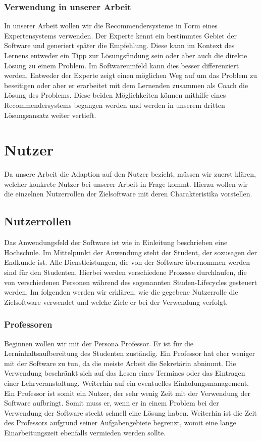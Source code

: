 \subsection{Verwendung in unserer Arbeit}
In unserer Arbeit wollen wir die Recommendersysteme in Form eines Expertensystems verwenden.  Der Experte kennt ein bestimmtes Gebiet der Software und generiert später die Empfehlung. Diese kann im Kontext des Lernens entweder ein Tipp zur Lösungsfindung sein oder aber auch die direkte Lösung zu einem Problem. Im Softwareumfeld kann dies besser differenziert werden. Entweder der Experte zeigt einen möglichen  Weg auf um das Problem zu beseitigen oder aber er erarbeitet mit dem Lernenden zusammen als Coach die Lösung des Problems. Diese beiden Möglichkeiten können mithilfe eines Recommendersystems begangen werden und werden in unserem dritten Lösungsansatz weiter vertieft.






\chapter{Nutzer}
Da unsere Arbeit die Adaption auf den Nutzer bezieht, müssen wir zuerst klären, welcher konkrete Nutzer bei unserer Arbeit in Frage kommt. Hierzu wollen wir die einzelnen Nutzerrollen der Zielsoftware mit deren Charakteristika vorstellen.


\section{Nutzerrollen}
Das Anwendungsfeld der Software ist wie in Einleitung beschrieben eine Hochschule. Im Mittelpunkt der Anwendung steht der Student, der sozusagen der Endkunde ist. Alle Dienstleistungen, die von der Software übernommen werden sind für den Studenten. Hierbei werden verschiedene Prozesse durchlaufen, die von verschiedenen Personen während des sogenannten Studen-Lifecycles gesteuert werden. Im folgenden werden wir erklären, wie die gegebene Nutzerrolle die Zielsoftware verwendet und welche Ziele er bei der Verwendung verfolgt.
\subsection{Professoren}
Beginnen wollen wir mit der Persona Professor. Er ist für die Lerninhaltsaufbereitung des Studenten zuständig. Ein Professor hat eher weniger mit der Software zu tun, da die meiste Arbeit die Sekretärin abnimmt. Die Verwendung beschränkt sich auf das Lesen eines Termines oder das Eintragen einer Lehrveranstaltung. Weiterhin auf ein eventuelles Einladungsmanagement. Ein Professor ist somit ein Nutzer, der sehr wenig Zeit mit der Verwendung der Software aufbringt. Somit muss er, wenn er in einem Problem bei der Verwendung der Software steckt schnell eine Lösung haben. Weiterhin ist die Zeit des Professors aufgrund seiner Aufgabengebiete begrenzt, womit eine lange Einarbeitungszeit ebenfalls vermieden werden sollte.
